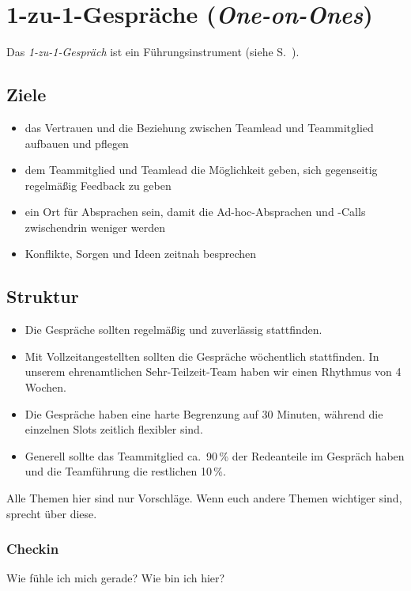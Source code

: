 \section{1-zu-1-Gespräche (\emph{One-on-Ones})}
\label{1-zu-1}

Das \emph{1-zu-1-Gespräch} ist ein Führungsinstrument (siehe S.~\pageref{fuehrungsinstrumente}).


\subsection{Ziele}

\begin{itemize}
 \item das Vertrauen und die Beziehung zwischen Teamlead und Teammitglied aufbauen und pflegen
 \item dem Teammitglied und Teamlead die Möglichkeit geben, sich gegenseitig regelmäßig Feedback zu geben
 \item ein Ort für Absprachen sein, damit die Ad-hoc-Absprachen und -Calls zwischendrin weniger werden
 \item Konflikte, Sorgen und Ideen zeitnah besprechen
\end{itemize}

\subsection{Struktur}

\begin{itemize}
 \item Die Gespräche sollten regelmäßig und zuverlässig stattfinden.
 \item Mit Vollzeitangestellten sollten die Gespräche wöchentlich stattfinden. In unserem ehrenamtlichen Sehr-Teilzeit-Team haben wir einen Rhythmus von 4 Wochen.
 \item Die Gespräche haben eine harte Begrenzung auf 30 Minuten, während die einzelnen Slots zeitlich flexibler sind.
 \item Generell sollte das Teammitglied ca.~90\,\% der Redeanteile im Gespräch haben und die Teamführung die restlichen 10\,\%.
\end{itemize}

Alle Themen hier sind nur Vorschläge. Wenn euch andere Themen wichtiger sind, sprecht über diese.

\subsubsection{Checkin}
Wie fühle ich mich gerade? Wie bin ich hier?

